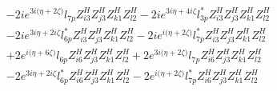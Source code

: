 \begin{align}
 &-2 i e^{3 i \Big(\eta +2 \zeta \Big)} l_{7p} Z_{{i 3}}^{H} Z_{{j 3}}^{H} Z_{{k 1}}^{H} Z_{{l 2}}^{H} -2 i e^{3 i \eta +4 i \zeta } l_{3p}^* Z_{{i 3}}^{H} Z_{{j 3}}^{H} Z_{{k 1}}^{H} Z_{{l 2}}^{H} \nonumber \\ 
 &-2 i e^{3 i \eta +2 i \zeta } l_{6p}^* Z_{{i 3}}^{H} Z_{{j 3}}^{H} Z_{{k 1}}^{H} Z_{{l 2}}^{H} -2 i e^{i \Big(\eta +2 \zeta \Big)} l_{7p}^* Z_{{i 3}}^{H} Z_{{j 3}}^{H} Z_{{k 1}}^{H} Z_{{l 2}}^{H} \nonumber \\ 
 &+2 e^{i \Big(\eta +6 \zeta \Big)} l_{6p} Z_{{i 6}}^{H} Z_{{j 3}}^{H} Z_{{k 1}}^{H} Z_{{l 2}}^{H} +2 e^{3 i \Big(\eta +2 \zeta \Big)} l_{7p} Z_{{i 6}}^{H} Z_{{j 3}}^{H} Z_{{k 1}}^{H} Z_{{l 2}}^{H} \nonumber \\ 
 &-2 e^{3 i \eta +2 i \zeta } l_{6p}^* Z_{{i 6}}^{H} Z_{{j 3}}^{H} Z_{{k 1}}^{H} Z_{{l 2}}^{H} -2 e^{i \Big(\eta +2 \zeta \Big)} l_{7p}^* Z_{{i 6}}^{H} Z_{{j 3}}^{H} Z_{{k 1}}^{H} Z_{{l 2}}^{H} \nonumber 
\end{align} 

